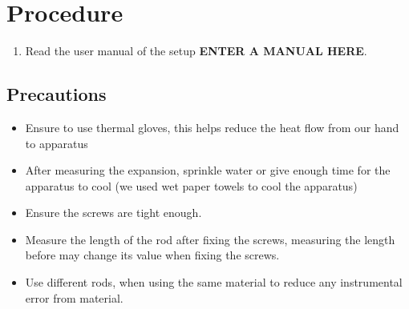 \documentclass[%
 sor,
 jor,
 amsmath,amssymb,
 reprint,
]{revtex4-2}
\begin{document}
\section{Procedure}
\begin{enumerate}
	\item Read the user manual of the setup \textbf{ENTER A MANUAL HERE}. 
\end{enumerate}
\subsection{Precautions}
\begin{itemize}
	\item Ensure to use thermal gloves, this helps reduce the heat flow from our hand to apparatus
	\item After measuring the expansion, sprinkle water or give enough time for the apparatus to cool (we used wet paper towels to cool the apparatus)
	\item Ensure the screws are tight enough. 
	\item Measure the length of the rod after fixing the screws, measuring the length before may change its value when fixing the screws.
	\item Use different rods, when using the same material to reduce any instrumental error from material.
\end{itemize}
\end{document}
